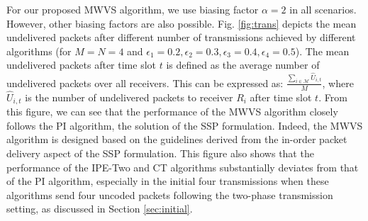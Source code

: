 \documentclass[12pt, peerreview, onecolumn]{IEEEtran}
\begin{document}
For our proposed MWVS algorithm, we use biasing factor   $\alpha = 2$  in all scenarios. However, other biasing factors  are also possible. Fig. \ref{fig:trans} depicts the  mean undelivered packets after different number of transmissions achieved by different algorithms (for $M = N = 4$ and $\epsilon_1 = 0.2, \epsilon_2 = 0.3, \epsilon_3 = 0.4, \epsilon_4 = 0.5 $).\footnotemark {}  The  mean undelivered packets after time slot $t$ is defined as the average  number of undelivered packets over all receivers. This can be expressed as: $\frac{\sum_{i \in \mathcal{M}} \hat{U}_{i,t}}{M}$, where  $\hat{U}_{i,t}$ is the number of undelivered packets to receiver $R_i$ after time slot $t$.   From this figure,  we can see that the performance  of the MWVS algorithm closely follows   the PI algorithm, the solution of the SSP formulation. Indeed, the MWVS algorithm is designed based on the guidelines derived from the in-order packet delivery aspect of the SSP formulation. This figure also shows that the performance of the  IPE-Two and CT algorithms substantially deviates from that of the PI algorithm, especially in the initial  four transmissions when these algorithms send four uncoded packets following the two-phase transmission setting, as discussed in Section \ref{sec:initial}.
\end{document}
